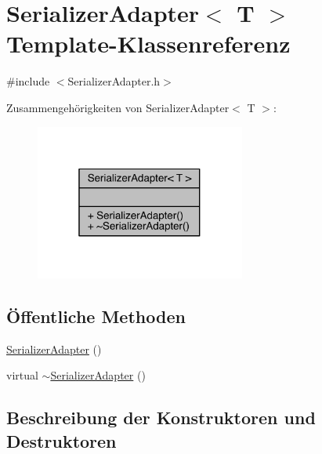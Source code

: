 \hypertarget{class_serializer_adapter}{}\section{Serializer\+Adapter$<$ T $>$ Template-\/\+Klassenreferenz}
\label{class_serializer_adapter}


{\ttfamily \#include $<$Serializer\+Adapter.\+h$>$}



Zusammengehörigkeiten von Serializer\+Adapter$<$ T $>$\+:
\nopagebreak
\begin{figure}[H]
\begin{center}
\leavevmode
\includegraphics[width=196pt]{class_serializer_adapter__coll__graph}
\end{center}
\end{figure}
\subsection*{Öffentliche Methoden}
\begin{DoxyCompactItemize}
\item 
\hyperlink{class_serializer_adapter_ac815cf2eb9414d93eae850d1d31c7120}{Serializer\+Adapter} ()
\item 
virtual \hyperlink{class_serializer_adapter_ab768851e14fa435e50f4d39faacaea89}{$\sim$\+Serializer\+Adapter} ()
\end{DoxyCompactItemize}


\subsection{Beschreibung der Konstruktoren und Destruktoren}
\hypertarget{class_serializer_adapter_ac815cf2eb9414d93eae850d1d31c7120}{}\label{class_serializer_adapter_ac815cf2eb9414d93eae850d1d31c7120} 
